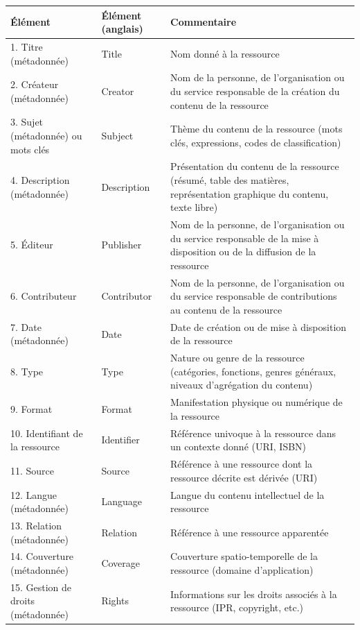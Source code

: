 \begin{longtable}{|p{4cm}|p{4cm}|p{8cm}|}
\hline
\textbf{Élément} & \textbf{Élément (anglais)} & \textbf{Commentaire} \\
\hline
1. Titre (métadonnée) & Title & Nom donné à la ressource \\
\hline
2. Créateur (métadonnée) & Creator & Nom de la personne, de l'organisation ou du service responsable de la création du contenu de la ressource \\
\hline
3. Sujet (métadonnée) ou mots clés & Subject & Thème du contenu de la ressource (mots clés, expressions, codes de classification) \\
\hline
4. Description (métadonnée) & Description & Présentation du contenu de la ressource (résumé, table des matières, représentation graphique du contenu, texte libre) \\
\hline
5. Éditeur & Publisher & Nom de la personne, de l'organisation ou du service responsable de la mise à disposition ou de la diffusion de la ressource \\
\hline
6. Contributeur & Contributor & Nom de la personne, de l'organisation ou du service responsable de contributions au contenu de la ressource \\
\hline
7. Date (métadonnée) & Date & Date de création ou de mise à disposition de la ressource \\
\hline
8. Type & Type & Nature ou genre de la ressource (catégories, fonctions, genres généraux, niveaux d'agrégation du contenu) \\
\hline
9. Format & Format & Manifestation physique ou numérique de la ressource \\
\hline
10. Identifiant de la ressource & Identifier & Référence univoque à la ressource dans un contexte donné (URI, ISBN) \\
\hline
11. Source & Source & Référence à une ressource dont la ressource décrite est dérivée (URI) \\
\hline
12. Langue (métadonnée) & Language & Langue du contenu intellectuel de la ressource \\
\hline
13. Relation (métadonnée) & Relation & Référence à une ressource apparentée \\
\hline
14. Couverture (métadonnée) & Coverage & Couverture spatio-temporelle de la ressource (domaine d'application) \\
\hline
15. Gestion de droits (métadonnée) & Rights & Informations sur les droits associés à la ressource (IPR, copyright, etc.) \\
\hline
\end{longtable}



